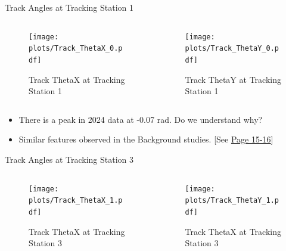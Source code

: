 \begin{frame}{Track Angles at Tracking Station 1}
	\begin{columns}
		\begin{column}{0.5\textwidth}
			\begin{figure}
				\texttt{[image: \\plots/Track\_ThetaX\_0.pdf]}
				\caption{Track ThetaX at Tracking Station 1}
			\end{figure}
		\end{column}
		\begin{column}{0.5\textwidth}
			\begin{figure}
				\texttt{[image: \\plots/Track\_ThetaY\_0.pdf]}
				\caption{Track ThetaY at Tracking Station 1}
			\end{figure}
		\end{column}
	\end{columns}
	\begin{itemize}
		\item There is a peak in 2024 data at -0.07 rad. Do we understand why?
		\item Similar features observed in the Background studies. [See \href{https://indico.cern.ch/event/1350790/contributions/5686387/attachments/2836819/4957405/Introduction.pdf}{Page 15-16}]
	\end{itemize}
\end{frame}

\begin{frame}{Track Angles at Tracking Station 3}
	\begin{columns}
		\begin{column}{0.5\textwidth}
			\begin{figure}
				\texttt{[image: \\plots/Track\_ThetaX\_1.pdf]}
				\caption{Track ThetaX at Tracking Station 3}
			\end{figure}
		\end{column}
		\begin{column}{0.5\textwidth}
			\begin{figure}
				\texttt{[image: \\plots/Track\_ThetaY\_1.pdf]}
				\caption{Track ThetaX at Tracking Station 3}
			\end{figure}
		\end{column}
	\end{columns}
\end{frame}


